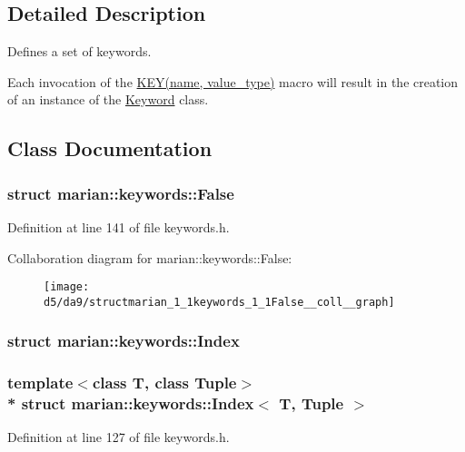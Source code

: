 \subsection{Detailed Description}
Defines a set of keywords. 

Each invocation of the \hyperlink{keywords_8h_ad6c9fa5917736eee3d55706caf21469d}{K\+E\+Y(name, value\+\_\+type)} macro will result in the creation of an instance of the \hyperlink{classmarian_1_1keywords_1_1Keyword}{Keyword} class. 

\subsection{Class Documentation}
\label{structmarian_1_1keywords_1_1False}
\hypertarget{namespacemarian_1_1keywords_structmarian_1_1keywords_1_1False}{}
\subsubsection{struct marian\+:\+:keywords\+:\+:False}


Definition at line 141 of file keywords.\+h.



Collaboration diagram for marian\+:\+:keywords\+:\+:False\+:
\nopagebreak
\begin{figure}[H]
\begin{center}
\leavevmode
\texttt{[image: d5/da9/structmarian\_1\_1keywords\_1\_1False\_\_coll\_\_graph]}
\end{center}
\end{figure}
\label{structmarian_1_1keywords_1_1Index}
\hypertarget{namespacemarian_1_1keywords_structmarian_1_1keywords_1_1Index}{}
\subsubsection{struct marian\+:\+:keywords\+:\+:Index}
\subsubsection*{template$<$class T, class Tuple$>$\\*
struct marian\+::keywords\+::\+Index$<$ T, Tuple $>$}



Definition at line 127 of file keywords.\+h.



